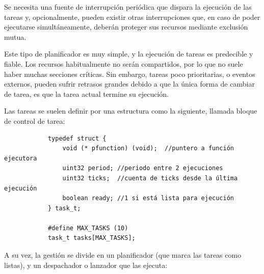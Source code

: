\documentclass[../main.tex]{subfiles}
\begin{document}
        Se necesita una fuente de interrupción periódica que dispara la ejecución de las tareas y, opcionalmente, pueden existir otras interrupciones que, en caso de poder ejecutarse simultáneamente, deberán proteger sus recursos mediante exclusión mutua.

        Este tipo de planificador es muy simple, y la ejecución de tareas es predecible y fiable. Los recursos habitualmente no serán compartidos, por lo que no suele haber muchas secciones críticas. Sin embargo, tareas poco prioritarias, o eventos externos, pueden sufrir retrasos grandes debido a que la única forma de cambiar de tarea, es que la tarea actual termine su ejecución.

        Las tareas se suelen definir por una estructura como la siguiente, llamada bloque de control de tarea:

        \begin{lstlisting}
            typedef struct { 
                void (* pfunction) (void);  //puntero a función ejecutora
                uint32 period; //periodo entre 2 ejecuciones
                uint32 ticks;  //cuenta de ticks desde la última ejecución
                boolean ready; //1 si está lista para ejecución
            } task_t; 
            
            #define MAX_TASKS (10) 
            task_t tasks[MAX_TASKS];   
        \end{lstlisting}

        A su vez, la gestión se divide en un planificador (que marca las tareas como listas), y un despachador o lanzador que las ejecuta:
\end{document}

